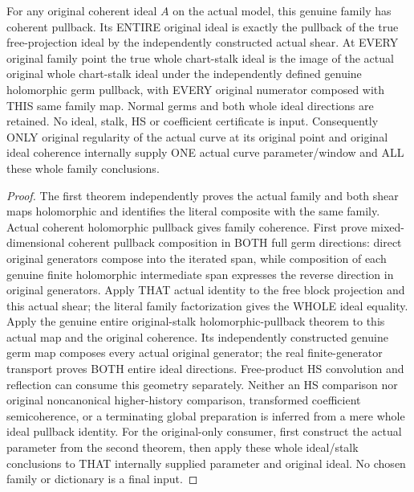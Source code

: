 \begin{theorem}
\label{hir:original-curve-translation-family-entire-pullback}
\leanok
For any original coherent ideal $A$ on the actual model, this genuine
family has coherent pullback. Its ENTIRE original ideal is exactly the
pullback of the true free-projection ideal by the independently constructed
actual shear. At EVERY original family point the true whole chart-stalk
ideal is the image of the actual original whole chart-stalk ideal under the
independently defined genuine holomorphic germ pullback, with EVERY
original numerator composed with THIS same family map. Normal germs and
both whole ideal directions are retained. No ideal, stalk, HS or coefficient
certificate is input. Consequently ONLY original regularity of the actual
curve at its original point and original ideal coherence internally supply
ONE actual curve parameter/window and ALL these whole family conclusions.
\end{theorem}
\begin{proof}
The first theorem independently proves the actual family and both shear
maps holomorphic and identifies the literal composite with the same
family. Actual coherent holomorphic pullback gives family coherence.
First prove mixed-dimensional coherent pullback composition in BOTH full
germ directions: direct original generators compose into the iterated
span, while composition of each genuine finite holomorphic intermediate
span expresses the reverse direction in original generators. Apply THAT
actual identity to the free block projection and this actual shear; the literal family
factorization gives the WHOLE ideal equality. Apply the genuine entire
original-stalk holomorphic-pullback theorem to this actual map and the
original coherence. Its independently constructed genuine germ map
composes every actual original generator; the real finite-generator
transport proves BOTH entire ideal directions. Free-product HS convolution
and reflection can consume this geometry separately. Neither an HS
comparison nor original noncanonical higher-history comparison,
transformed coefficient semicoherence, or a terminating global preparation
is inferred from a mere whole ideal pullback identity. For the original-only consumer, first
construct the actual parameter from the second theorem, then apply these
whole ideal/stalk conclusions to THAT internally supplied parameter and
original ideal. No chosen family or dictionary is a final input.
\end{proof}
